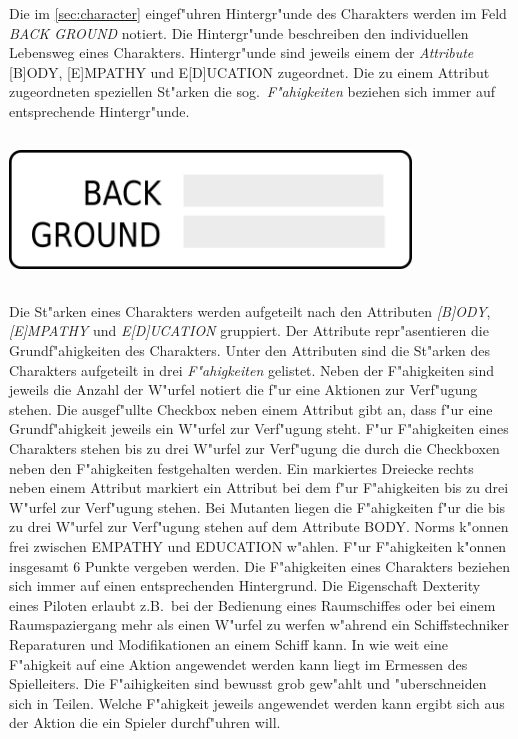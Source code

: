 \begin{column}[l]{0.52}
    Die im \cref{sec:character} eingef"uhren Hintergr"unde des Charakters werden im Feld \emph{BACK GROUND} notiert. Die Hintergr"unde beschreiben den individuellen Lebensweg eines Charakters. Hintergr"unde sind jeweils einem der \emph{Attribute} [B]ODY, [E]MPATHY und E[D]UCATION zugeordnet. Die zu einem Attribut zugeordneten speziellen St"arken die sog.~\emph{F"ahigkeiten} beziehen sich immer auf entsprechende Hintergr"unde.
\end{column}
\begin{column}[r]{0.48}
    \centering
    \includegraphics[width=0.80\textwidth]{images/character_background.png}    
\end{column}

Die St"arken eines Charakters werden aufgeteilt nach den Attributen \emph{[B]ODY}, \emph{[E]MPATHY} und \emph{E[D]UCATION} gruppiert. Der Attribute repr"asentieren die Grundf"ahigkeiten des Charakters. Unter den Attributen sind die St"arken des Charakters aufgeteilt in drei \emph{F"ahigkeiten} gelistet. Neben der F"ahigkeiten sind jeweils die Anzahl der W"urfel notiert die f"ur eine Aktionen zur Verf"ugung stehen. Die ausgef"ullte Checkbox neben einem Attribut gibt an, dass f"ur eine Grundf"ahigkeit jeweils ein W"urfel zur Verf"ugung steht. F"ur F"ahigkeiten eines Charakters stehen bis zu drei W"urfel zur Verf"ugung die durch die Checkboxen neben den F"ahigkeiten festgehalten werden. Ein markiertes Dreiecke rechts neben einem Attribut markiert ein Attribut bei dem f"ur F"ahigkeiten bis zu drei W"urfel zur Verf"ugung stehen. Bei Mutanten liegen die F"ahigkeiten f"ur die bis zu drei W"urfel zur Verf"ugung stehen auf dem Attribute BODY. Norms k"onnen frei zwischen EMPATHY und EDUCATION w"ahlen. F"ur F"ahigkeiten k"onnen insgesamt 6 Punkte vergeben werden.
Die F"ahigkeiten eines Charakters beziehen sich immer auf einen entsprechenden Hintergrund. Die Eigenschaft Dexterity eines Piloten erlaubt z.B.~bei der Bedienung eines Raumschiffes oder bei einem Raumspaziergang mehr als einen W"urfel zu werfen w"ahrend ein Schiffstechniker Reparaturen und Modifikationen an einem Schiff kann. In wie weit eine F"ahigkeit auf eine Aktion angewendet werden kann liegt im Ermessen des Spielleiters. Die F"aihigkeiten sind bewusst grob gew"ahlt und "uberschneiden sich in Teilen. Welche F"ahigkeit jeweils angewendet werden kann ergibt sich aus der Aktion die ein Spieler durchf"uhren will.

